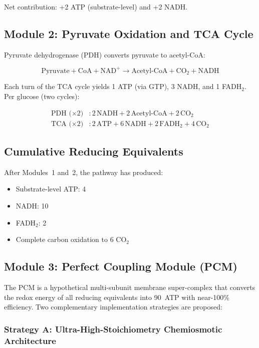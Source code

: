 \documentclass[12pt]{article}
\begin{document}
Net contribution: +2 ATP (substrate-level) and +2 NADH.

\subsection{Module 2: Pyruvate Oxidation and TCA Cycle}

Pyruvate dehydrogenase (PDH) converts pyruvate to acetyl-CoA:

\begin{equation}
\mathrm{Pyruvate + CoA + NAD^+ \longrightarrow Acetyl\text{-}CoA + CO_2 + NADH}
\label{eq:pdh}
\end{equation}

Each turn of the TCA cycle yields 1 ATP (via GTP), 3 NADH, and 1 FADH$_2$. Per glucose (two cycles):

\begin{align}
\text{PDH ($\times$2)} &: 2\,\mathrm{NADH} + 2\,\mathrm{Acetyl\text{-}CoA} + 2\,\mathrm{CO_2} \nonumber \\
\text{TCA ($\times$2)} &: 2\,\mathrm{ATP} + 6\,\mathrm{NADH} + 2\,\mathrm{FADH_2} + 4\,\mathrm{CO_2}
\label{eq:tca_summary}
\end{align}

\subsection{Cumulative Reducing Equivalents}

After Modules~1 and~2, the pathway has produced:
\begin{itemize}
    \item Substrate-level ATP: 4
    \item NADH: 10
    \item FADH$_2$: 2
    \item Complete carbon oxidation to 6 CO$_2$
\end{itemize}

\subsection{Module 3: Perfect Coupling Module (PCM)}

The PCM is a hypothetical multi-subunit membrane super-complex that converts the redox energy of all reducing equivalents into 90~ATP with near-100\% efficiency. Two complementary implementation strategies are proposed:

\subsubsection{Strategy A: Ultra-High-Stoichiometry Chemiosmotic Architecture}
\end{document}
